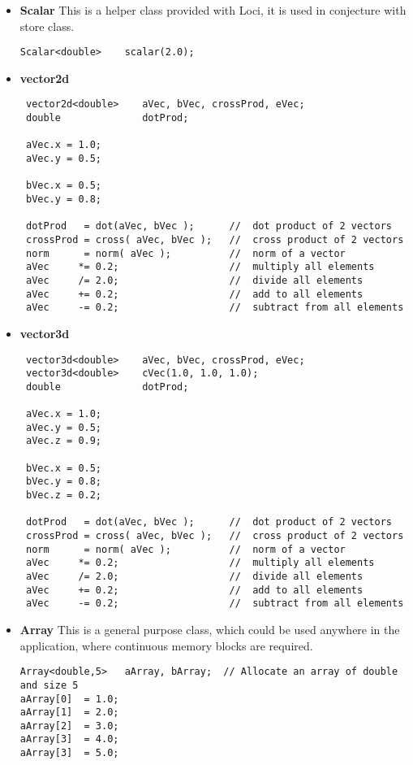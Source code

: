 \begin{itemize}
\item {\bf Scalar} This is a helper class provided with Loci, it is used in conjecture
with store class.

\begin{verbatim}
Scalar<double>    scalar(2.0);
\end{verbatim}

\item {\bf vector2d}
\begin{verbatim}
 vector2d<double>    aVec, bVec, crossProd, eVec;
 double              dotProd;

 aVec.x = 1.0;
 aVec.y = 0.5;

 bVec.x = 0.5;
 bVec.y = 0.8;

 dotProd   = dot(aVec, bVec );      //  dot product of 2 vectors
 crossProd = cross( aVec, bVec );   //  cross product of 2 vectors
 norm      = norm( aVec );          //  norm of a vector
 aVec     *= 0.2;                   //  multiply all elements
 aVec     /= 2.0;                   //  divide all elements
 aVec     += 0.2;                   //  add to all elements
 aVec     -= 0.2;                   //  subtract from all elements
\end{verbatim}

\item {\bf vector3d}
\begin{verbatim}
 vector3d<double>    aVec, bVec, crossProd, eVec;
 vector3d<double>    cVec(1.0, 1.0, 1.0);
 double              dotProd;

 aVec.x = 1.0;
 aVec.y = 0.5;
 aVec.z = 0.9;

 bVec.x = 0.5;
 bVec.y = 0.8;
 bVec.z = 0.2;

 dotProd   = dot(aVec, bVec );      //  dot product of 2 vectors
 crossProd = cross( aVec, bVec );   //  cross product of 2 vectors
 norm      = norm( aVec );          //  norm of a vector
 aVec     *= 0.2;                   //  multiply all elements
 aVec     /= 2.0;                   //  divide all elements
 aVec     += 0.2;                   //  add to all elements
 aVec     -= 0.2;                   //  subtract from all elements
\end{verbatim}
%
\item {\bf Array} This is a general purpose class, which could be used anywhere in
the application, where continuous memory blocks are required.

\begin{verbatim}
Array<double,5>   aArray, bArray;  // Allocate an array of double and size 5
aArray[0]  = 1.0;             
aArray[1]  = 2.0;
aArray[2]  = 3.0;
aArray[3]  = 4.0;
aArray[3]  = 5.0;


\end{verbatim}
\end{itemize}

